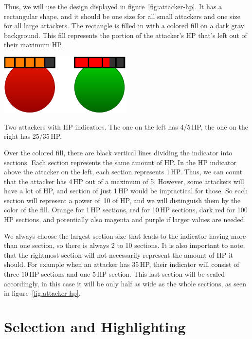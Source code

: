Thus, we will use the design displayed in figure~\ref{fig:attacker-hp}.
It has a rectangular shape, and it should be one size for all small attackers and one size for all large attackers.
The rectangle is filled in with a colored fill on a dark gray background.
This fill represents the portion of the attacker's HP that's left out of their maximum HP.

\begin{center}
    \captionsetup{type=figure}
    \includegraphics[width=0.5\textwidth]{img/Attacker HP.pdf}
    \caption{Two attackers with HP indicators. The one on the left has 4/5\,HP, the one on the right has 25/35\,HP.}
    \label{fig:attacker-hp}
\end{center}

Over the colored fill, there are black vertical lines dividing the indicator into sections.
Each section represents the same amount of HP.
In the HP indicator above the attacker on the left, each section represents 1\,HP.
Thus, we can count that the attacker has 4\,HP out of a maximum of 5.
However, some attackers will have a lot of HP, and section of just 1\,HP would be impractical for those.
So each section will represent a power of~10 of HP, and we will distinguish them by the color of the fill.
Orange for 1\,HP sections, red for 10\,HP sections, dark red for 100\,HP sections, and potentially also magenta and purple if larger values are needed.

We always choose the largest section size that leads to the indicator having more than one section, so there is always 2 to 10 sections.
It is also important to note, that the rightmost section will not necessarily represent the amount of HP it should.
For example when an attacker has 35\,HP, their indicator will consist of three 10\,HP sections and one 5\,HP section.
This last section will be scaled accordingly, in this case it will be only half as wide as the whole sections, as seen in figure~\ref{fig:attacker-hp}.

\section{Selection and Highlighting}\label{sec:design-selection-highlights}

